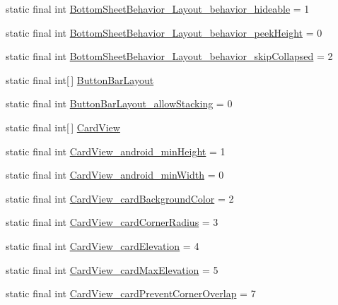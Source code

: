 \begin{CompactItemize}
\item 
static final int \hyperlink{classandroid_1_1support_1_1v4_1_1_r_1_1styleable_aa3e1df0519e9c584de90cb3311b3ab9}{BottomSheetBehavior\_\-Layout\_\-behavior\_\-hideable} = 1
\item 
static final int \hyperlink{classandroid_1_1support_1_1v4_1_1_r_1_1styleable_c5dfbc2d674faeb8b8e9c8aca7bace87}{BottomSheetBehavior\_\-Layout\_\-behavior\_\-peekHeight} = 0
\item 
static final int \hyperlink{classandroid_1_1support_1_1v4_1_1_r_1_1styleable_5f8ab199874fa9fe7918ba54df0f40cc}{BottomSheetBehavior\_\-Layout\_\-behavior\_\-skipCollapsed} = 2
\item 
static final int\mbox{[}$\,$\mbox{]} \hyperlink{classandroid_1_1support_1_1v4_1_1_r_1_1styleable_89ab1bc4e8f12a7cf690670f5c8f2e54}{ButtonBarLayout}
\item 
static final int \hyperlink{classandroid_1_1support_1_1v4_1_1_r_1_1styleable_dfe9fca963c8e4366d8e5dedf151f185}{ButtonBarLayout\_\-allowStacking} = 0
\item 
static final int\mbox{[}$\,$\mbox{]} \hyperlink{classandroid_1_1support_1_1v4_1_1_r_1_1styleable_4fcc6453aa91deadd7072add3aee5e56}{CardView}
\item 
static final int \hyperlink{classandroid_1_1support_1_1v4_1_1_r_1_1styleable_577b2e52dc2fbfc09f905ea26e5f682e}{CardView\_\-android\_\-minHeight} = 1
\item 
static final int \hyperlink{classandroid_1_1support_1_1v4_1_1_r_1_1styleable_3cd23d6fa94330913ba4cb084d788c59}{CardView\_\-android\_\-minWidth} = 0
\item 
static final int \hyperlink{classandroid_1_1support_1_1v4_1_1_r_1_1styleable_94fc58f0d182831ec612958ddf3d8b9f}{CardView\_\-cardBackgroundColor} = 2
\item 
static final int \hyperlink{classandroid_1_1support_1_1v4_1_1_r_1_1styleable_aac33a30bef514283621969faf8acce1}{CardView\_\-cardCornerRadius} = 3
\item 
static final int \hyperlink{classandroid_1_1support_1_1v4_1_1_r_1_1styleable_c0ff8cacb9a2d63dd25ab692b44a2804}{CardView\_\-cardElevation} = 4
\item 
static final int \hyperlink{classandroid_1_1support_1_1v4_1_1_r_1_1styleable_7e06403a899e01eae19c14aae1ee38cc}{CardView\_\-cardMaxElevation} = 5
\item 
static final int \hyperlink{classandroid_1_1support_1_1v4_1_1_r_1_1styleable_7759a07eb90cf3b5a562d36a7f68e79f}{CardView\_\-cardPreventCornerOverlap} = 7
\item 

\end{CompactItemize}
